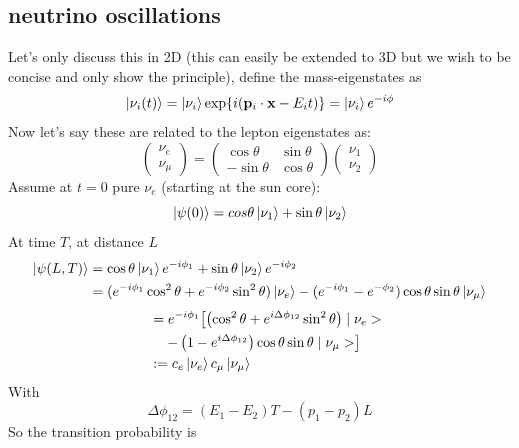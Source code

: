 \documentclass[11pt,a4paper,faculty=we,language=en,doctype=report]{cls/ugent-doc}
\begin{document}
\subsection{neutrino oscillations}
Let's only discuss this in 2D (this can easily be extended to 3D but we wish to be 
concise and only show the principle), define the mass-eigenstates as 
\begin{equation}
	\ket{\nu_i(t)} = \ket{\nu_i}\exp\{i(\mathbf{p}_i\cdot\mathbf{x} - E_i t)\} = \ket{\nu_i}e^{-i\phi}
\end{equation}
Now let's say these are related to the lepton eigenstates as:
\begin{equation}
	\left(\begin{matrix}\nu_e\\\nu_\mu\end{matrix}\right)=\left(\begin{matrix}\cos{\theta}&\sin{\theta}\\-\sin{\theta}&\cos{\theta}\end{matrix}\right)\left(\begin{matrix}\nu_1\\\nu_2\end{matrix}\right)
\end{equation}
Assume at $t=0$ pure $\nu_e$ (starting at the sun core):
\begin{equation}
	\ket{\psi(0)} = cos{\theta} \ket{\nu_1} + \sin{\theta}\ket{\nu_2}
\end{equation}
At time $T$, at distance $L$
\begin{align}
	\ket{\psi(L, T)} &= \cos{\theta} \ket{\nu_1}e^{-i \phi_1}+\sin{\theta}\ket{\nu_2}e^{-i \phi_2}\\
			 &= (e^{-i\phi_1}\cos^2{\theta} + e^{-i\phi_2}\sin^2{\theta})\ket{\nu_e} 
			 - (e^{-i\phi_1} - e^{-\phi_2})\cos{\theta}\sin{\theta}\ket{\nu_\mu}
\end{align}
\begin{align}
&\quad=e^{-i \phi_1} {\left[\left(\cos ^2 \theta+e^{i \Delta \phi_{12}} \sin ^2 \theta\right) \mid \nu_e>\right.} \\
&\qquad\left.-\left(1-e^{i \Delta \phi_{12}}\right) \cos \theta \sin \theta \mid \nu_\mu>\right]\\
&\quad:=c_e\ket{\nu_e} c_\mu\ket{\nu_\mu}
\end{align}
With
\begin{equation}
	\Delta \phi_{12}=\left(E_1-E_2\right) T-\left(p_1-p_2\right) L
\end{equation}
So the transition probability is
\end{document}
